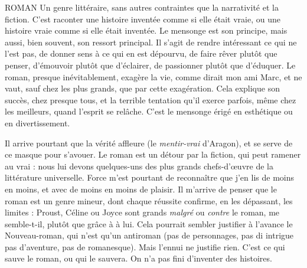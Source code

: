 ROMAN Un genre littéraire, sans autres contraintes que la narrativité et la
fiction. C’est raconter une histoire inventée comme si elle était
vraie, ou une histoire vraie comme si elle était inventée. Le mensonge est son
principe, mais aussi, bien souvent, son ressort principal. Il s’agit de rendre intéressant
ce qui ne l’est pas, de donner sens à ce qui en est dépourvu, de faire
rêver plutôt que penser, d’émouvoir plutôt que d'éclairer, de passionner plutôt
que d’éduquer. Le roman, presque inévitablement, exagère la vie, comme dirait
mon ami Marc, et ne vaut, sauf chez les plus grands, que par cette exagération.
Cela explique son succès, chez presque tous, et la terrible tentation qu’il exerce
parfois, même chez les meilleurs, quand l'esprit se relâche. C’est le mensonge
érigé en esthétique ou en divertissement.

Il arrive pourtant que la vérité affleure (le {\it mentir-vrai} d'Aragon), et se serve
de ce masque pour s’avouer. Le roman est un détour par la fiction, qui peut
ramener au vrai : nous lui devons quelques-uns des plus grands chefs-d’œuvre de
la littérature universelle. Force m'est pourtant de reconnaître que j'en lis de
moins en moins, et avec de moins en moins de plaisir. Il m’arrive de penser que
le roman est un genre mineur, dont chaque réussite confirme, en les dépassant,
les limites : Proust, Céline ou Joyce sont grands {\it malgré} ou {\it contre} le roman, me
semble-t-il, plutôt que grâce à à lui. Cela pourrait sembler justifier à l’avance le
Nouveau-roman, qui n’est qu’un antiroman (pas de personnages, pas di intrigue
pas d'aventure, pas de romanesque). Mais l’ennui ne justifie rien. C’est ce qui
sauve le roman, ou qui le sauvera. On n’a pas fini d’inventer des histoires.

